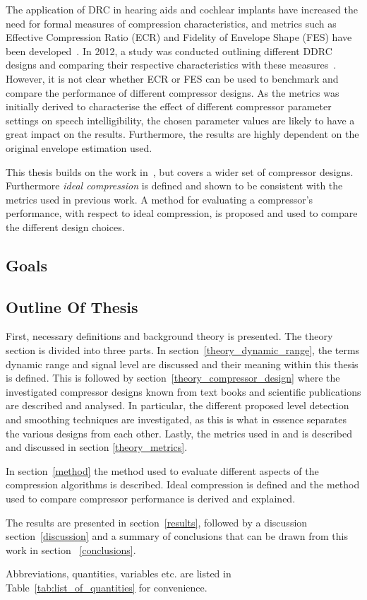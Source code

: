 \documentclass[../main2.tex]{subfiles}
\providecommand{\rootdir}{..}
\begin{document}
The application of DRC in hearing aids and cochlear implants have increased the need for formal measures of compression characteristics, and metrics such as Effective Compression Ratio (ECR) and Fidelity of Envelope Shape (FES) have been developed~\cite{stone1992syllabic}\cite{stone2007quantifying}. In 2012, a study was conducted outlining different DDRC designs and comparing their respective characteristics with these measures~\cite{reiss2012tutorial}. However, it is not clear whether ECR or FES can be used to benchmark and compare the performance of different compressor designs. As the metrics was initially derived to characterise the effect of different compressor parameter settings on speech intelligibility, the chosen parameter values are likely to have a great impact on the results. Furthermore, the results are highly dependent on the original envelope estimation used.

This thesis builds on the work in~\cite{reiss2012tutorial}, but covers a wider set of compressor designs. Furthermore \emph{ideal compression} is defined and shown to be consistent with the metrics used in previous work. A method for evaluating a compressor's performance, with respect to ideal compression, is proposed and used to compare the different design choices.
\subsection{Goals}

\subsection{Outline Of Thesis}
First, necessary definitions and background theory is presented. The theory section is divided into three parts. In section~\ref{theory_dynamic_range}, the terms dynamic range and signal level are discussed and their meaning within this thesis is defined. This is followed by section~\ref{theory_compressor_design} where the investigated compressor designs known from text books and scientific publications are described and analysed. In particular, the different proposed level detection and smoothing techniques are investigated, as this is what in essence separates the various designs from each other. Lastly, the metrics used in \cite{stone1992syllabic}\cite{stone2007quantifying} and \cite{reiss2012tutorial} is described and discussed in section \ref{theory_metrics}.

In section~\ref{method} the method used to evaluate different aspects of the compression algorithms is described. Ideal compression is defined and the method used to compare compressor performance is derived and explained.

The results are presented in section~\ref{results}, followed by a discussion section~\ref{discussion} and a summary of conclusions that can be drawn from this work in section ~\ref{conclusions}.

Abbreviations, quantities, variables etc. are listed in Table~\ref{tab:list_of_quantities} for convenience.

\end{document}
